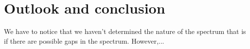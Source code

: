 \chapter{Outlook and conclusion}	 \label{chap:8}
	
	
We have to notice that we haven't determined the nature of the spectrum that is if there are possible gaps in the spectrum. However,... %
~\\ ~\\

